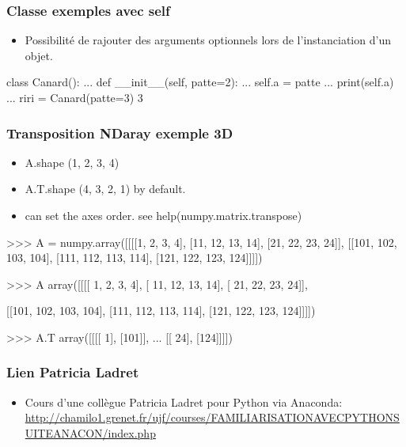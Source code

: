 \begin{frame}[fragile]
\frametitle{Classe exemples avec self}
\begin{itemize}
 \item Possibilité de rajouter des arguments optionnels lors de l'instanciation d'un objet. 
\end{itemize}
\begin{pythonConsole}
class Canard(): 
...     def __init__(self, patte=2):
...             self.a = patte
...             print(self.a)
... 
riri = Canard(patte=3)
3
\end{pythonConsole}
\end{frame}
\begin{frame}[fragile]
\frametitle{Transposition NDaray exemple 3D}
\begin{itemize}
 \item A.shape (1, 2, 3, 4)
 \item A.T.shape (4, 3, 2, 1) by default. 
 \item can set the axes order. see help(numpy.matrix.transpose)
\end{itemize}
\begin{pythonConsole}
>>> A = numpy.array([[[[1, 2, 3, 4], [11, 12, 13, 14], [21, 22, 23, 24]], [[101, 102, 103, 104], [111, 112, 113, 114], [121, 122, 123, 124]]]])

>>> A
array([[[[  1,   2,   3,   4],
         [ 11,  12,  13,  14],
         [ 21,  22,  23,  24]],

        [[101, 102, 103, 104],
         [111, 112, 113, 114],
         [121, 122, 123, 124]]]])

>>> A.T
array([[[[  1],
         [101]],
         ...
        [[ 24],
         [124]]]])
\end{pythonConsole}
\end{frame}
\begin{frame}
\frametitle{Lien Patricia Ladret}
\begin{itemize}
 \item Cours d'une collègue Patricia Ladret pour Python via Anaconda: 
 \url{http://chamilo1.grenet.fr/ujf/courses/FAMILIARISATIONAVECPYTHONSUITEANACON/index.php}
\end{itemize}
\end{frame}
